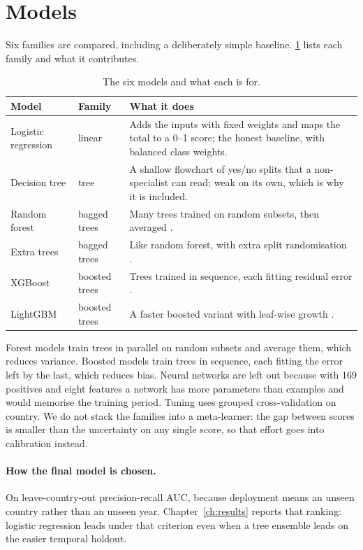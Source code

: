 \documentclass[10pt,openany]{report}
\begin{document}
\section{Models}

Six families are compared, including a deliberately simple baseline.
\cref{tab:models-tried} lists each family and what it contributes.

\begin{table}[htbp]
\centering
\caption{The six models and what each is for.}
\label{tab:models-tried}
\small
\begin{tabular}{@{}>{\raggedright\arraybackslash}p{3.0cm}
                >{\raggedright\arraybackslash}p{2.4cm}
                >{\raggedright\arraybackslash}p{8.4cm}@{}}
\toprule
\textbf{Model} & \textbf{Family} & \textbf{What it does} \\
\midrule
Logistic regression & linear & Adds the inputs with fixed weights and maps the total to a 0--1
score; the honest baseline, with balanced class weights. \\
Decision tree & tree & A shallow flowchart of yes/no splits that a non-specialist can read; weak on
its own, which is why it is included. \\
Random forest & bagged trees & Many trees trained on random subsets, then averaged
\cite{breiman2001}. \\
Extra trees & bagged trees & Like random forest, with extra split randomisation
\cite{breiman2001}. \\
XGBoost & boosted trees & Trees trained in sequence, each fitting residual error
\cite{chen2016}. \\
LightGBM & boosted trees & A faster boosted variant with leaf-wise growth \cite{ke2017}. \\
\bottomrule
\end{tabular}
\end{table}

Forest models train trees in parallel on random subsets and average them, which reduces variance.
Boosted models train trees in sequence, each fitting the error left by the last, which reduces bias.
Neural networks are left out because with 169 positives and eight features a network has more
parameters than examples and would memorise the training period. Tuning uses grouped
cross-validation on country. We do not stack the families into a meta-learner: the gap between
scores is smaller than the uncertainty on any single score, so that effort goes into calibration
instead.

\paragraph{How the final model is chosen.}
On leave-country-out precision-recall AUC, because deployment means an unseen country rather than an
unseen year. Chapter~\ref{ch:results} reports that ranking: logistic regression leads under that
criterion even when a tree ensemble leads on the easier temporal holdout.
\end{document}
